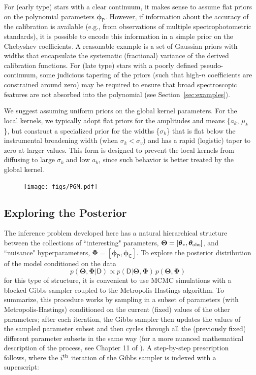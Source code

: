 \documentclass[iop,floatfix,numberedappendix,twocolappendix]{emulateapj}
\newcommand{\vD}{\mathsf{D}}
\newcommand{\vt}{ {\bm \theta}}
\newcommand{\vT}{ {\bm \Theta}}
\newcommand{\vp}{ {\bm \phi}}
\newcommand{\vP}{ {\bm \Phi}}
\newcommand{\cheb}{ \vp_{\mathsf{P}}}
\newcommand{\cov}{ \vp_{\mathsf{C}}}
\begin{document}
For (early type) stars with a clear continuum, it makes sense to assume flat priors on the 
polynomial parameters $\cheb$.  However, if information about the accuracy of the calibration is 
available (e.g., from observations of multiple spectrophotometric standards), it is possible to 
encode this information in a simple prior on the Chebyshev coefficients.  A reasonable example is a 
set of Gaussian priors with widths that encapsulate the systematic (fractional) variance of the 
derived calibration functions.  For (late type) stars with a poorly defined pseudo-continuum, 
some judicious tapering of the priors (such that high-$n$ coefficients are constrained around zero) 
may be required to ensure that broad spectroscopic features are not absorbed into the polynomial 
(see Section~\ref{sec:examples}). 

We suggest assuming uniform priors on the global kernel parameters.  For the local kernels, we 
typically adopt flat priors for the amplitudes and means \{$a_k$, $\mu_k$\}, but construct a 
specialized prior for the widths \{$\sigma_k$\} that is flat below the instrumental broadening 
width (when $\sigma_k < \sigma_v$) and has a rapid (logistic) taper to zero at larger values.  This 
form is designed to prevent the local kernels from diffusing to large $\sigma_k$ and low $a_k$,
since such behavior is better treated by the global kernel.  

\begin{figure}[!htb]
  \texttt{[image: figs/PGM.pdf]}
\end{figure}

\subsection{Exploring the Posterior} \label{subsec:MCMC}

The inference problem developed here has a natural hierarchical structure between the collections 
of ``interesting" parameters, $\vT = [\vt_{\ast}, \vt_{\rm obs}]$, and ``nuisance" hyperparameters, 
$\vP = [\cheb, \cov]$.  To explore the posterior distribution of the model conditioned on the data
\begin{equation} 
p(\vT, \vP | \vD) \propto p(\vD | \vT, \vP) \, p(\vT, \vP)
\label{eqn:post}
\end{equation}
for this type of structure, it is convenient to use MCMC simulations with a blocked Gibbs 
sampler coupled to the Metropolis-Hastings algorithm.  To summarize, this procedure works by 
sampling in a subset of parameters (with Metropolis-Hastings) conditioned on the current (fixed) 
values of the other parameters; after each iteration, the Gibbs sampler then updates the values of 
the sampled parameter subset and then cycles through all the (previously fixed) different parameter 
subsets in the same way (for a more nuanced mathematical description of the process, see Chapter 11 
of \citealt{gelman13}).  A step-by-step prescription follows, where the $i^{\rm th}$ 
iteration of the Gibbs sampler is indexed with a superscript: \\
\end{document}
